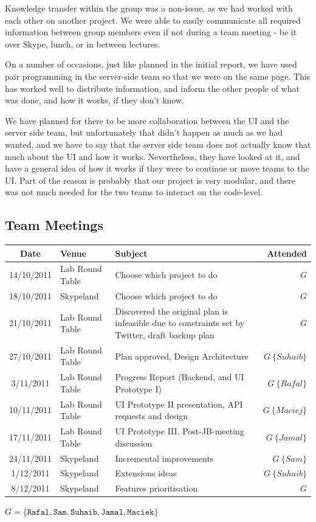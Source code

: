 \documentclass[a4paper,12pt]{article}
\begin{document}
		Knowledge transfer within the group was a non-issue, as we had worked with each other on another project. We were able to easily communicate all required information between group members even if not during a team meeting - be it over Skype, lunch, or in between lectures.
		
		On a number of occasions, just like planned in the initial report, we have used pair programming in the server-side team so that we were on the same page. This has worked well to distribute information, and inform the other people of what was done, and how it works, if they don't know. 
		
		We have planned for there to be more collaboration between the UI and the server side team, but unfortunately that didn't happen as much as we had wanted, and we have to say that the server side team does not actually know that much about the UI and how it works. Nevertheless, they have looked at it, and have a general idea of how it works if they were to continue or move teams to the UI. Part of the reason is probably that our project is very modular, and there was not much needed for the two teams to interact on the code-level.
	
	
  \subsection{Team Meetings}
  \begin{tabular}{c | l p{7cm} r}
    Date & Venue & Subject &Attended\\
    \hline
    14/10/2011 & Lab Round Table & Choose which project to do & \(G\)\\
    18/10/2011 & Skypeland & Choose which project to do & \(G\)\\
    21/10/2011 & Lab Round Table & Discovered the original plan is infeasible due to constraints set by Twitter, draft backup plan & \(G\)\\
    27/10/2011 & Lab Round Table & Plan approved, Design Architecture & \(G\ \{Suhaib\}\)\\
    3/11/2011 & Lab Round Table & Progress Report (Backend, and UI Prototype I) & \(G\ \{Rafal\}\)\\
    10/11/2011 & Lab Round Table & UI Prototype II presentation, API requests and design & \(G\ \{Maciej\}\)\\
    17/11/2011 & Lab Round Table & UI Prototype III. Post-JB-meeting discussion & \(G\ \{Jamal\}\)\\
    24/11/2011 & Skypeland & Incremental improvements & \(G\ \{Sam\}\)\\
    1/12/2011 & Skypeland & Extensions ideas & \(G \ \{Suhaib\}\)\\
    8/12/2011 & Skypeland & Features prioritisation & \(G\)\\
  \end{tabular}
  \(G=\{\texttt{Rafal}, \texttt{Sam}, \texttt{Suhaib}, \texttt{Jamal}, \texttt{Maciek}\}\)\\
	
\end{document}
